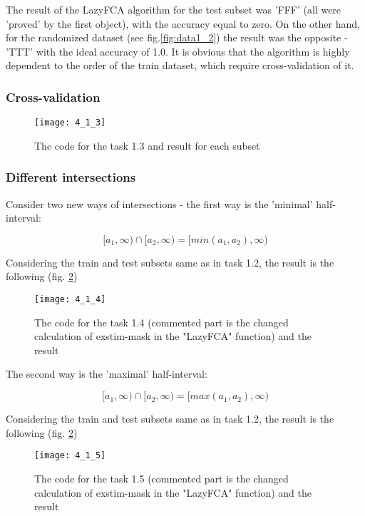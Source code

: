 The result of the LazyFCA algorithm for the test subset was 'FFF' (all were 'proved' by the first object), with the accuracy equal to zero. 
On the other hand, for the randomized dataset (see fig.\ref{fig:data1_2}) the result was the opposite - 'TTT' with the ideal accuracy of 1.0.
It is obvious that the algorithm is highly dependent to the order of the train dataset, which require cross-validation of it.


\subsubsection{Cross-validation}

\begin{figure}[h]
\centering
\texttt{[image: 4\_1\_3]}
\caption{The code for the task 1.3 and result for each subset}
\end{figure}

\subsubsection{Different intersections}

Consider two new ways of intersections - the first way is the 'minimal' half-interval:

\[ [a_1, \infty) \cap [a_2, \infty) = [min(a_1,a_2), \infty) \]

Considering the train and test subsets same as in task 1.2, the result is the following (fig. \ref{fig:min_int})

\begin{figure}[h]
\centering
\label{fig:min_int}
\texttt{[image: 4\_1\_4]}
\caption{The code for the task 1.4 (commented part is the changed calculation of exstim-mask in the "LazyFCA" function) and the result}
\end{figure}

The second way is the 'maximal' half-interval:

\[ [a_1, \infty) \cap [a_2, \infty) = [max(a_1,a_2), \infty) \]

Considering the train and test subsets same as in task 1.2, the result is the following (fig. \ref{fig:min_int})

\begin{figure}[h]
\centering
\label{fig:min_int}
\texttt{[image: 4\_1\_5]}
\caption{The code for the task 1.5 (commented part is the changed calculation of exstim-mask in the "LazyFCA" function) and the result}
\end{figure}

